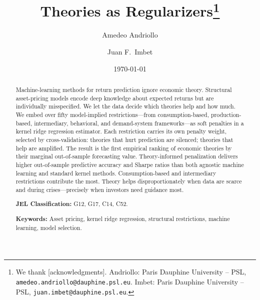 \documentclass[12pt]{article}
\title{\textbf{Theories as Regularizers}\thanks{%
We thank [acknowledgments].
Andriollo: Paris Dauphine University -- PSL, \texttt{amedeo.andriollo@dauphine.psl.eu}.
Imbet: Paris Dauphine University -- PSL, \texttt{juan.imbet@dauphine.psl.eu}.}}
\author{Amedeo Andriollo \and Juan F.\ Imbet}
\date{\today}
\theoremstyle{plain}
\theoremstyle{definition}
\theoremstyle{remark}
\begin{document}
\maketitle

\begin{abstract}
\begin{singlespace}
\noindent
Machine-learning methods for return prediction ignore economic theory. Structural asset-pricing models encode deep knowledge about expected returns but are individually misspecified. We let the data decide which theories help and how much. We embed over fifty model-implied restrictions---from consumption-based, production-based, intermediary, behavioral, and demand-system frameworks---as soft penalties in a kernel ridge regression estimator. Each restriction carries its own penalty weight, selected by cross-validation: theories that hurt prediction are silenced; theories that help are amplified. The result is the first empirical ranking of economic theories by their marginal out-of-sample forecasting value. Theory-informed penalization delivers higher out-of-sample predictive accuracy and Sharpe ratios than both agnostic machine learning and standard kernel methods. Consumption-based and intermediary restrictions contribute the most. Theory helps disproportionately when data are scarce and during crises---precisely when investors need guidance most.

\medskip
\noindent\textbf{JEL Classification:} G12, G17, C14, C52.

\noindent\textbf{Keywords:} Asset pricing, kernel ridge regression, structural restrictions, machine learning, model selection.
\end{singlespace}
\end{abstract}

\thispagestyle{empty}
\newpage
\setcounter{page}{1}











\newpage



\newpage



\newpage
\appendix

\end{document}

